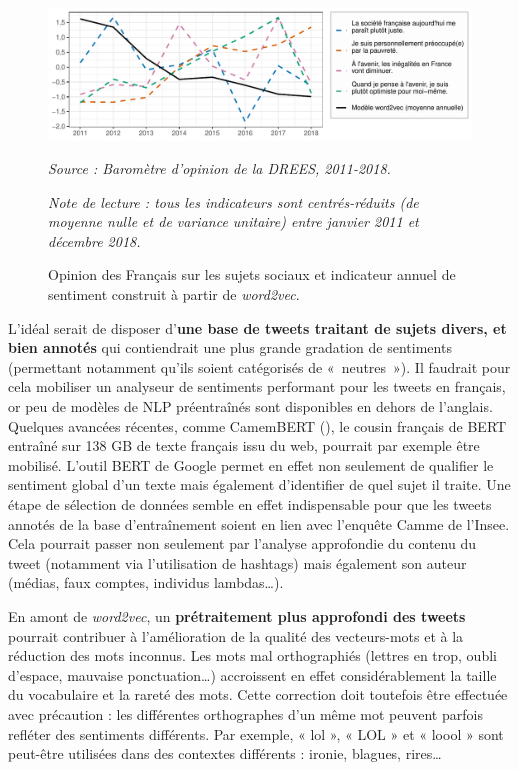 \documentclass[11pt,french,french]{article}
\begin{document}
\begin{figure}[htp]
{\centering \includegraphics[width =\textwidth]{img/rmd-graphConclu-1}}
\captionsetup{margin=0cm,format=hang,justification=justified}
\caption{Opinion des Français sur les sujets sociaux et indicateur annuel de sentiment construit à partir de \emph{word2vec}.}\label{fig:figconclu}
\footnotesize
\emph{Source : Baromètre d'opinion de la DREES, 2011-2018.}

\emph{Note de lecture : tous les indicateurs sont centrés-réduits (de moyenne nulle et de variance unitaire) entre janvier 2011 et décembre 2018.}
\end{figure}

L'idéal serait de disposer d'\textbf{une base de tweets traitant de
sujets divers, et bien annotés} qui contiendrait une plus grande
gradation de sentiments (permettant notamment qu'ils soient catégorisés
de «~neutres~»). Il faudrait pour cela mobiliser un analyseur de
sentiments performant pour les tweets en français, or peu de modèles de
NLP préentraînés sont disponibles en dehors de l'anglais. Quelques
avancées récentes, comme CamemBERT (\cite{Martin}), le cousin français
de BERT entraîné sur 138 GB de texte français issu du web, pourrait par
exemple être mobilisé. L'outil BERT de Google permet en effet non
seulement de qualifier le sentiment global d'un texte mais également
d'identifier de quel sujet il traite. Une étape de sélection de données
semble en effet indispensable pour que les tweets annotés de la base
d'entraînement soient en lien avec l'enquête Camme de l'Insee. Cela
pourrait passer non seulement par l'analyse approfondie du contenu du
tweet (notamment via l'utilisation de hashtags) mais également son
auteur (médias, faux comptes, individus lambdas\dots).

En amont de \emph{word2vec}, un \textbf{prétraitement plus approfondi
des tweets} pourrait contribuer à l'amélioration de la qualité des
vecteurs-mots et à la réduction des mots inconnus. Les mots mal
orthographiés (lettres en trop, oubli d'espace, mauvaise
ponctuation\dots) accroissent en effet considérablement la taille du
vocabulaire et la rareté des mots. Cette correction doit toutefois être
effectuée avec précaution : les différentes orthographes d'un même mot
peuvent parfois refléter des sentiments différents. Par exemple, « lol
», « LOL » et « loool » sont peut-être utilisées dans des contextes
différents : ironie, blagues, rires\dots 
\end{document}
